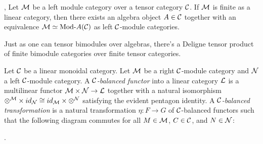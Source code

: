 \documentclass{amsart}
\begin{document}
\begin{theorem}{\cite[Thm 2.11.6]{EGNO}, \cite[Thm 1]{MR1976459}} \label{thm:EGNO2.11.6}
	Let $\mathcal M$ be a left module category over a tensor category $\mathcal C$. If $\mathcal M$ is finite as a linear category, then there exists an algebra object $A \in \mathcal C$ together with an equivalence $\cM \simeq \Mod{}{A} (\cC)$ as left $\mathcal C$-module categories.
\end{theorem}




Just as one can tensor bimodules over algebras, there's a Deligne tensor product of finite bimodule categories over finite tensor categories.

\begin{definition}
	Let $\mathcal C$ be a linear monoidal category. 
	Let $\mathcal M$ be a right $\mathcal C$-module category and $\mathcal N$ a left $\mathcal C$-module category. A {\em $\mathcal C$-balanced functor} into a linear category $\mathcal L$ is a multilinear functor $\mathcal M \times \mathcal N \to \mathcal L$ together with a natural isomorphism $\otimes^{\mathcal M} \times id_{\mathcal N} \cong id_{\mathcal M} \times \otimes^{\mathcal N}$ satisfying the evident pentagon identity. A {\em $\mathcal C$-balanced transformation} is a natural transformation $\eta:F \to G$ of $\mathcal C$-balanced functors such that the following diagram commutes for all $M \in \mathcal M$, $C \in \mathcal C$, and $N \in \mathcal N$:
\begin{center}
.
\end{center}
\end{definition}
\end{document}
